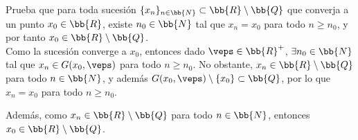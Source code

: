 \documentclass[12pt]{article}
\begin{document}
    \begin{ejercicio}
        Prueba que para toda sucesión $\{x_n\}_{n\in \bb{N}}\subset \bb{R}\setminus \bb{Q}$
        que converja a un punto $x_0\in \bb{R}$, existe $n_0\in \bb{N}$ tal que
        $x_n=x_0$ para todo $n\geq n_0$, y por tanto $x_0\in \bb{R}\setminus \bb{Q}$.\\

        Como la sucesión converge a $x_0$, entonces dado $\veps\in \bb{R}^+$, $\exists n_0\in \bb{N}$ tal que $x_n\in G(x_0,\veps)$ para todo $n\geq n_0$.
        No obstante, $x_n\in \bb{R}\setminus \bb{Q}$ para todo $n\in \bb{N}$, y además $G(x_0,\veps)\setminus \{x_0\}\subset \bb{Q}$,
        por lo que $x_n=x_0$ para todo $n\geq n_0$.
        
        Además, como $x_n\in \bb{R}\setminus \bb{Q}$ para todo $n\in \bb{N}$, entonces $x_0\in \bb{R}\setminus \bb{Q}$.
    \end{ejercicio}
\end{document}
